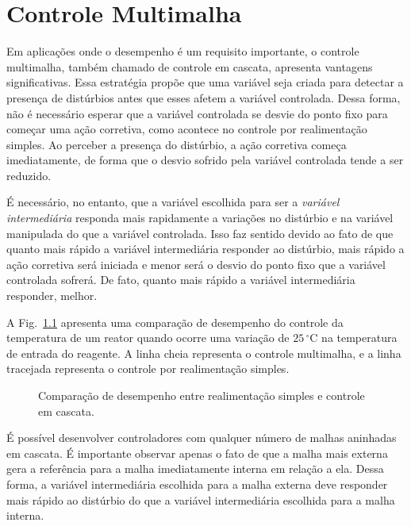 
\chapter{Controle Multimalha}\label{controle}

	Em aplicações onde o desempenho é um requisito importante, o controle multimalha, também chamado de controle em cascata, apresenta vantagens significativas. Essa estratégia propõe que uma variável seja criada para detectar a presença de distúrbios antes que esses afetem a variável controlada. Dessa forma, não é necessário esperar que a variável controlada se desvie do ponto fixo para começar uma ação corretiva, como acontece no controle por realimentação simples. Ao perceber a presença do distúrbio, a ação corretiva começa imediatamente, de forma que o desvio sofrido pela variável controlada tende a ser reduzido.

  É necessário, no entanto, que a variável escolhida para ser a \emph{variável intermediária} responda mais rapidamente a variações no distúrbio e na variável manipulada do que a variável controlada. Isso faz sentido devido ao fato de que quanto mais rápido a variável intermediária responder ao distúrbio, mais rápido a ação corretiva será iniciada e menor será o desvio do ponto fixo que a variável controlada sofrerá. De fato, quanto mais rápido a variável intermediária responder, melhor.

  A Fig.~\ref{fig:realimentacao_vs_cascata} apresenta uma comparação de desempenho do controle da temperatura de um reator quando ocorre uma variação de $25\,^{\circ}\mathrm{C}$ na temperatura de entrada do reagente. A linha cheia representa o controle multimalha, e a linha tracejada representa o controle por realimentação simples.

  \begin{figure}[htb]
    \renewcommand\figurename{Fig.}
    \caption{Comparação de desempenho entre realimentação simples e controle em cascata.}
    \label{fig:realimentacao_vs_cascata}
  \end{figure}

  É possível desenvolver controladores com qualquer número de malhas aninhadas em cascata. É importante observar apenas o fato de que a malha mais externa gera a referência para a malha imediatamente interna em relação a ela. Dessa forma, a variável intermediária escolhida para a malha externa deve responder mais rápido ao distúrbio do que a variável intermediária escolhida para a malha interna.

